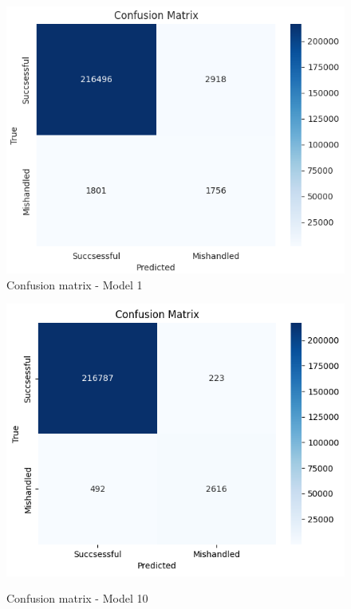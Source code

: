 \documentclass[12pt]{article}
\begin{document}
\FloatBarrier
\begin{figure}
\begin{minipage}[c]{0.45\linewidth}
    \includegraphics[width=1\textwidth]{Confusion_matrix_Model 1.png}\\
    \caption{Confusion matrix - Model 1}
    \label{fig:Confusion_matrix_Model 1}
\end{minipage}
\hfill
\begin{minipage}[c]{0.45\linewidth}
    \includegraphics[width=1\textwidth]{Confusion_matrix_Model 10.png}\\
    \caption{Confusion matrix - Model 10}
    \label{fig:Confusion_matrix_Model 10}
\end{minipage}%
\end{figure}
\FloatBarrier
\end{document}
